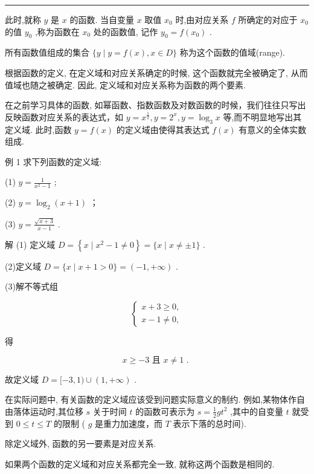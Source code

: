 \documentclass[10pt]{article}
\newcommand{\HRule}{\begin{center}\rule{0.9\linewidth}{0.2mm}\end{center}}
\begin{document}
\HRule



此时,就称 \(y\) 是 \(x\) 的函数. 当自变量 \(x\) 取值 \({x}_{0}\) 时,由对应关系 \(f\) 所确定的对应于 \({x}_{0}\) 的值 \({y}_{0}\) ,称为函数在 \({x}_{0}\) 处的函数值, 记作 \({y}_{0} = f\left( {x}_{0}\right)\) .

所有函数值组成的集合 \(\{ y \mid  y = f\left( x\right) ,x \in  D\}\) 称为这个函数的值域(range).

根据函数的定义, 在定义域和对应关系确定的时候, 这个函数就完全被确定了, 从而值域也随之被确定. 因此, 定义域和对应关系称为函数的两个要素.

在之前学习具体的函数, 如幂函数、指数函数及对数函数的时候，我们往往只写出反映函数对应关系的表达式，如 \(y = {x}^{\frac{1}{2}},y = {2}^{x},y = {\log }_{3}x\) 等,而不明显地写出其定义域. 此时,函数 \(y = f\left( x\right)\) 的定义域由使得其表达式 \(f\left( x\right)\) 有意义的全体实数组成.

例 1 求下列函数的定义域:

(1) \(y = \frac{1}{{x}^{2} - 1}\) ;

(2) \(y = {\log }_{2}\left( {x + 1}\right)\) ；

(3) \(y = \frac{\sqrt{x + 3}}{x - 1}\) .

解 (1) 定义域 \(D = \left\{  {x \mid  {x}^{2} - 1 \neq  0}\right\}   = \{ x \mid  x \neq   \pm  1\}\) .

(2)定义域 \(D = \{ x \mid  x + 1 > 0\}  = \left( {-1, + \infty }\right)\) .

(3)解不等式组

\[
\left\{  \begin{array}{l} x + 3 \geq  0, \\  x - 1 \neq  0, \end{array}\right.
\]

得

\[
x \geq   - 3\text{ 且 }x \neq  1\text{ . }
\]

故定义域 \(D = \lbrack  - 3,1) \cup  \left( {1, + \infty }\right)\) .

在实际问题中, 有关函数的定义域应该受到问题实际意义的制约. 例如,某物体作自由落体运动时,其位移 \(s\) 关于时间 \(t\) 的函数可表示为 \(s = \frac{1}{2}g{t}^{2}\) ,其中的自变量 \(t\) 就受到 \(0 \leq  t \leq  T\) 的限制 ( \(g\) 是重力加速度，而 \(T\) 表示下落的总时间).

除定义域外, 函数的另一要素是对应关系.

如果两个函数的定义域和对应关系都完全一致, 就称这两个函数是相同的.
\end{document}
